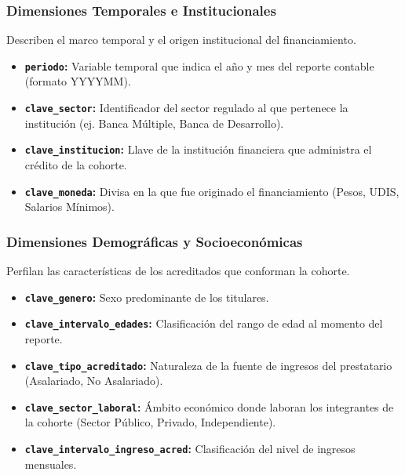\subsubsection*{Dimensiones Temporales e Institucionales}
Describen el marco temporal y el origen institucional del financiamiento.
\begin{itemize}
	\item \textbf{\texttt{periodo}:} Variable temporal que indica el año y mes del reporte contable (formato YYYYMM).
	\item \textbf{\texttt{clave\_sector}:} Identificador del sector regulado al que pertenece la institución (ej. Banca Múltiple, Banca de Desarrollo).
	\item \textbf{\texttt{clave\_institucion}:} Llave de la institución financiera que administra el crédito de la cohorte.
	\item \textbf{\texttt{clave\_moneda}:} Divisa en la que fue originado el financiamiento (Pesos, UDIS, Salarios Mínimos).
\end{itemize}

\subsubsection*{Dimensiones Demográficas y Socioeconómicas}
Perfilan las características de los acreditados que conforman la cohorte.
\begin{itemize}
	\item \textbf{\texttt{clave\_genero}:} Sexo predominante de los titulares.
	\item \textbf{\texttt{clave\_intervalo\_edades}:} Clasificación del rango de edad al momento del reporte.
	\item \textbf{\texttt{clave\_tipo\_acreditado}:} Naturaleza de la fuente de ingresos del prestatario (Asalariado, No Asalariado).
	\item \textbf{\texttt{clave\_sector\_laboral}:} Ámbito económico donde laboran los integrantes de la cohorte (Sector Público, Privado, Independiente).
	\item \textbf{\texttt{clave\_intervalo\_ingreso\_acred}:} Clasificación del nivel de ingresos mensuales.
\end{itemize}

